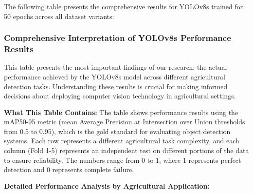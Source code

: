 The following table presents the comprehensive results for YOLOv8s trained for 50 epochs across all dataset variants:

\begin{table}[H]
\centering
\caption{YOLOv8s Performance Results - 50 Epochs (mAP50-95)}
\label{tab:yolov8s_50_results}
\end{table}

\subsubsection{Comprehensive Interpretation of YOLOv8s Performance Results}

This table presents the most important findings of our research: the actual performance achieved by the YOLOv8s model across different agricultural detection tasks. Understanding these results is crucial for making informed decisions about deploying computer vision technology in agricultural settings.

\textbf{What This Table Contains:} The table shows performance results using the mAP50-95 metric (mean Average Precision at Intersection over Union thresholds from 0.5 to 0.95), which is the gold standard for evaluating object detection systems. Each row represents a different agricultural task complexity, and each column (Fold 1-5) represents an independent test on different portions of the data to ensure reliability. The numbers range from 0 to 1, where 1 represents perfect detection and 0 represents complete failure.

\textbf{Detailed Performance Analysis by Agricultural Application:}

